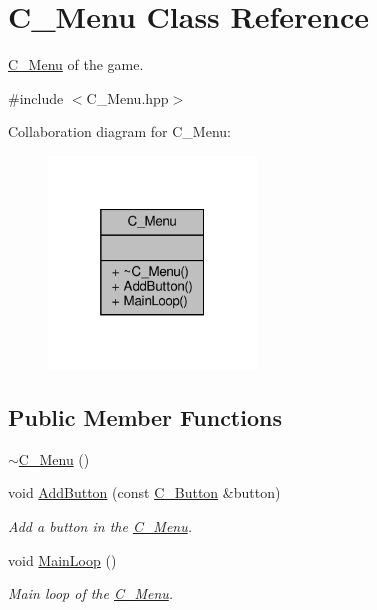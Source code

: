 \hypertarget{classC__Menu}{}\section{C\+\_\+\+Menu Class Reference}
\label{classC__Menu}


\hyperlink{classC__Menu}{C\+\_\+\+Menu} of the game.  




{\ttfamily \#include $<$C\+\_\+\+Menu.\+hpp$>$}



Collaboration diagram for C\+\_\+\+Menu\+:
\nopagebreak
\begin{figure}[H]
\begin{center}
\leavevmode
\includegraphics[width=157pt]{classC__Menu__coll__graph}
\end{center}
\end{figure}
\subsection*{Public Member Functions}
\begin{DoxyCompactItemize}
\item 
\hyperlink{classC__Menu_a4b1250911f29522e9766f5ad2f02b595}{$\sim$\+C\+\_\+\+Menu} ()
\item 
void \hyperlink{classC__Menu_a9a4f7a0022f39f35b7af9c5d2b6f31ec}{Add\+Button} (const \hyperlink{classC__Button}{C\+\_\+\+Button} \&button)
\begin{DoxyCompactList}\small\item\em Add a button in the \hyperlink{classC__Menu}{C\+\_\+\+Menu}. \end{DoxyCompactList}\item 
void \hyperlink{classC__Menu_a9529be708fad2c6deca21034bc37f59d}{Main\+Loop} ()
\begin{DoxyCompactList}\small\item\em Main loop of the \hyperlink{classC__Menu}{C\+\_\+\+Menu}. \end{DoxyCompactList}\end{DoxyCompactItemize}


